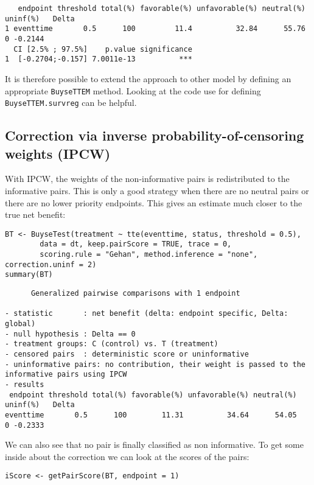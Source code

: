 \documentclass[12pt]{article}
\begin{document}
\begin{verbatim}
   endpoint threshold total(%) favorable(%) unfavorable(%) neutral(%) uninf(%)   Delta
1 eventtime       0.5      100         11.4          32.84      55.76        0 -0.2144
  CI [2.5% ; 97.5%]    p.value significance
1  [-0.2704;-0.157] 7.0011e-13          ***
\end{verbatim}

It is therefore possible to extend the approach to other model by
defining an appropriate \texttt{BuyseTTEM} method. Looking at the code use
for defining \texttt{BuyseTTEM.survreg} can be helpful.

\subsection{Correction via inverse probability-of-censoring weights (IPCW)}
\label{sec:org2a33fbf}

With IPCW, the weights of the non-informative pairs is redistributed
to the informative pairs. This is only a good strategy when there are
no neutral pairs or there are no lower priority endpoints. This gives
an estimate much closer to the true net benefit:
\lstset{language=r,label= ,caption= ,captionpos=b,numbers=none}
\begin{lstlisting}
BT <- BuyseTest(treatment ~ tte(eventtime, status, threshold = 0.5),
		data = dt, keep.pairScore = TRUE, trace = 0,
		scoring.rule = "Gehan", method.inference = "none", correction.uninf = 2)
summary(BT)
\end{lstlisting}

\begin{verbatim}
      Generalized pairwise comparisons with 1 endpoint

- statistic       : net benefit (delta: endpoint specific, Delta: global) 
- null hypothesis : Delta == 0 
- treatment groups: C (control) vs. T (treatment) 
- censored pairs  : deterministic score or uninformative
- uninformative pairs: no contribution, their weight is passed to the informative pairs using IPCW
- results
 endpoint threshold total(%) favorable(%) unfavorable(%) neutral(%) uninf(%)   Delta
eventtime       0.5      100        11.31          34.64      54.05        0 -0.2333
\end{verbatim}


We can also see that no pair is finally classified as non
informative. To get some inside about the correction we can look at
the scores of the pairs:
\lstset{language=r,label= ,caption= ,captionpos=b,numbers=none}
\begin{lstlisting}
iScore <- getPairScore(BT, endpoint = 1)
\end{lstlisting}
\end{document}
